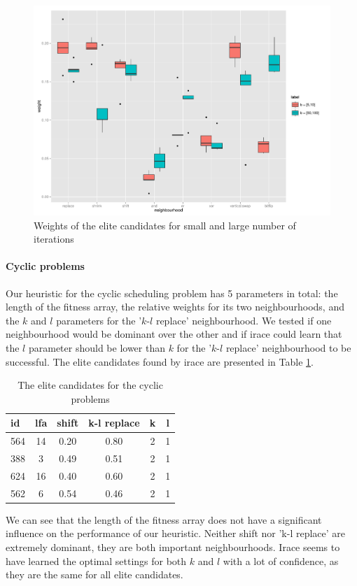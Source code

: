 \documentclass[]{article}
\begin{document}
\begin{figure}
	\includegraphics[width=\textwidth]{boxplot_iteration.pdf}
	\caption{Weights of the elite candidates for small and large number of iterations}
	\label{fig:iterations}
\end{figure}

\paragraph{Cyclic problems}
Our heuristic for the cyclic scheduling problem has 5 parameters in total: the length of the fitness array, the relative weights for its two neighbourhoods, and the $k$ and $l$ parameters for the '$k$-$l$ replace' neighbourhood. We tested if one neighbourhood would be dominant over the other and if irace could learn that the $l$ parameter should be lower than $k$ for the '$k$-$l$ replace' neighbourhood to be successful. The elite candidates found by irace are presented in Table \ref{tbl:cyclic}.

\begin{table}[]
	\centering
	\begin{tabular}{lccccc}
		\hline
		id &lfa&   shift & k-l replace& k& l \\ \hline
		564 & 14 &0.20& 0.80& 2 &1           \\
		388  & 3 &0.49 &0.51 &2 &1           \\
		624  &16 &0.40 &0.60 &2 &1           \\
		562  & 6 &0.54 &0.46 &2 &1           \\ \hline
	\end{tabular}
	\caption{The elite candidates for the cyclic problems}
	\label{tbl:cyclic}
\end{table}
We can see that the length of the fitness array does not have a significant influence on the performance of our heuristic. Neither shift nor 'k-l replace' are extremely dominant, they are both important neighbourhoods. Irace seems to have learned the optimal settings for both $k$ and $l$ with a lot of confidence, as they are the same for all elite candidates.
\end{document}
